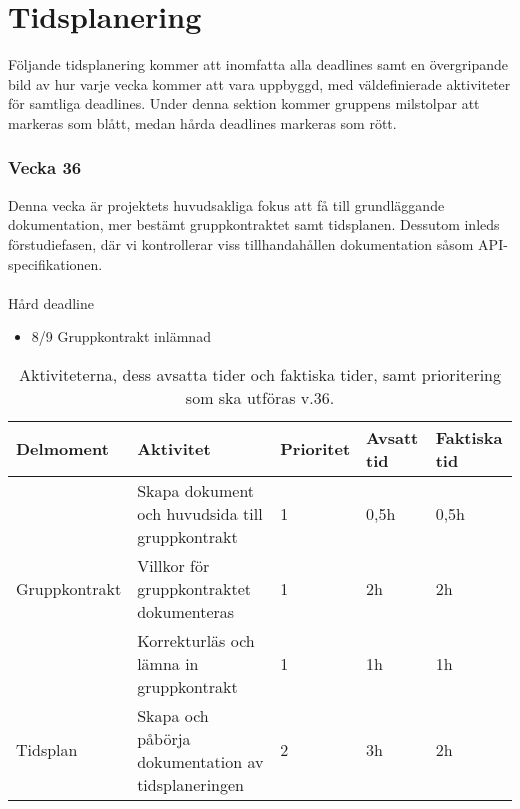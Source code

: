 \documentclass{TDP003mall}
\begin{document}
\pagebreak

\section*{Tidsplanering}
Följande tidsplanering kommer att inomfatta alla deadlines samt en övergripande bild av hur varje vecka kommer att vara uppbyggd, med väldefinierade aktiviteter för samtliga deadlines. Under denna sektion kommer gruppens milstolpar att markeras som blått, medan hårda deadlines markeras som rött.

\subsubsection*{Vecka 36}

Denna vecka är projektets huvudsakliga fokus att få till grundläggande dokumentation, mer bestämt gruppkontraktet samt tidsplanen. Dessutom inleds förstudiefasen, där vi kontrollerar viss tillhandahållen dokumentation såsom API-specifikationen.\\
\\
Hård deadline
\begin{itemize}
\color{red}
    \item 8/9 Gruppkontrakt inlämnad
\end{itemize}

\begin{table}[h]
\begin{tabularx}{\textwidth}{|l|X|l|l|l|}
\hline
Delmoment     & Aktivitet       & Prioritet  & Avsatt tid & Faktiska tid \\ \hline
    \multirow{3}{*}{Gruppkontrakt} & Skapa dokument och huvudsida till gruppkontrakt & 1      & 0,5h       & 0,5h     \\ \cline{2-5}
         & Villkor för gruppkontraktet dokumenteras         & 1       & 2h     &    2h \\ \cline{2-5}
         & Korrekturläs och lämna in gruppkontrakt  & 1       & 1h      & 1h      \\ \hline
    Tidsplan & Skapa och påbörja dokumentation av tidsplaneringen   & 2 & 3h        & 2h  \\ \hline
\end{tabularx}
\centering
    \caption{\label{tab:table-name}Aktiviteterna, dess avsatta tider och faktiska tider, samt prioritering som ska utföras v.36.}
\end{table}
\end{document}
